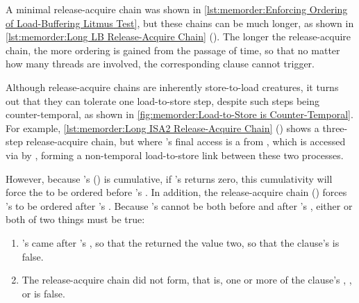 A minimal release-acquire chain was shown in
\cref{lst:memorder:Enforcing Ordering of Load-Buffering Litmus Test},
but these chains can be much longer, as shown in
\cref{lst:memorder:Long LB Release-Acquire Chain}
().
The longer the release-acquire chain, the more ordering is gained
from the passage of time, so that no matter how many threads are
involved, the corresponding  clause cannot trigger.

\begin{listing}[tbp]

\caption{Long LB Release-Acquire Chain}
\label{lst:memorder:Long LB Release-Acquire Chain}
\end{listing}

Although release-acquire chains are inherently store-to-load creatures,
it turns out that they can tolerate one load-to-store step, despite
such steps being counter-temporal, as shown in
\cref{fig:memorder:Load-to-Store is Counter-Temporal}.
For example,
\cref{lst:memorder:Long ISA2 Release-Acquire Chain}
()
shows a three-step release-acquire chain, but where 's
final access is a  from , which is
accessed via  by , forming a non-temporal
load-to-store link between these two processes.
\begin{fcvref}
However, because 's  ()
is cumulative, if 's  returns zero,
this cumulativity will force the  to be ordered
before 's .
In addition, the release-acquire chain
()
forces 's  to be ordered after 's
.
Because 's  cannot be both before and after
's , either or both of two things must
be true:
\end{fcvref}

\begin{listing}[tbp]

\caption{Long ISA2 Release-Acquire Chain}
\label{lst:memorder:Long ISA2 Release-Acquire Chain}
\end{listing}

\begin{enumerate}
\item	{}'s  came after 's
	, so that the  returned
	the value two, so that the  clause's 
	is false.
\item	The release-acquire chain did not form, that is, one or more
	of the  clause's , , or 
	is false.
\end{enumerate}


